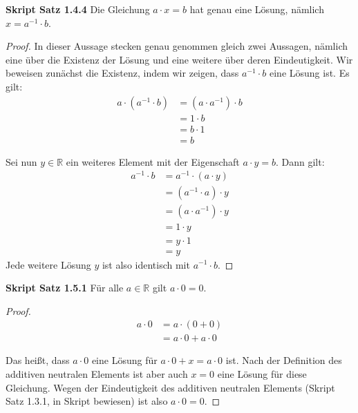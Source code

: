 \documentclass[12pt]{extarticle}
\begin{document}
\textbf{Skript Satz 1.4.4} Die Gleichung \(a \cdot x = b\) hat genau
eine Lösung, nämlich \(x = a^{-1} \cdot b\).
\begin{proof}
  In dieser Aussage stecken genau genommen gleich zwei Aussagen,
  nämlich eine über die Existenz der Lösung und eine weitere über
  deren Eindeutigkeit.  Wir beweisen zunächst die Existenz, indem wir
  zeigen, dass \(a^{-1} \cdot b\) eine Lösung ist.  Es gilt:
\begin{align*}
  a \cdot (a^{-1} \cdot b) &= (a \cdot a^{-1}) \cdot b \tag*{M1} \\
                           &= 1 \cdot b \tag*{M4} \\
                           &= b \cdot 1 \tag*{M2} \\
  &= b \tag*{M3}
\end{align*}

Sei nun \(y \in \mathbb{R}\) ein weiteres Element mit der Eigenschaft
\(a \cdot y = b\).  Dann gilt:
\begin{align*}
  a^{-1} \cdot b &= a^{-1} \cdot (a \cdot y) \tag*{Definition von \(y\)}
  \\
                 &= (a^{-1} \cdot a) \cdot y \tag*{M1} \\
                 &= (a \cdot a^{-1}) \cdot y \tag*{M2} \\
                 &= 1 \cdot y \tag*{M4} \\
                 &= y \cdot 1 \tag*{M2} \\
  &= y \tag*{M3}
\end{align*}
Jede weitere Lösung \(y\) ist also identisch mit \(a^{-1} \cdot b\).
\end{proof}

\textbf{Skript Satz 1.5.1} Für alle \(a \in \mathbb{R}\) gilt $a \cdot
0 = 0$.

\begin{proof}

\begin{align*}
  a \cdot 0 &= a \cdot (0+0) \tag*{A3} \\
  &= a \cdot 0 + a \cdot 0 \tag*{D}
\end{align*}


Das heißt, dass \(a \cdot 0\) eine Lösung für
\(a \cdot 0 + x = a \cdot 0\) ist.  Nach der Definition des additiven
neutralen Elements ist aber auch \(x = 0\) eine Lösung für diese Gleichung.
Wegen der Eindeutigkeit des additiven neutralen Elements (Skript Satz
1.3.1, in Skript bewiesen) ist also \(a \cdot 0 = 0\).
\end{proof}
\end{document}
